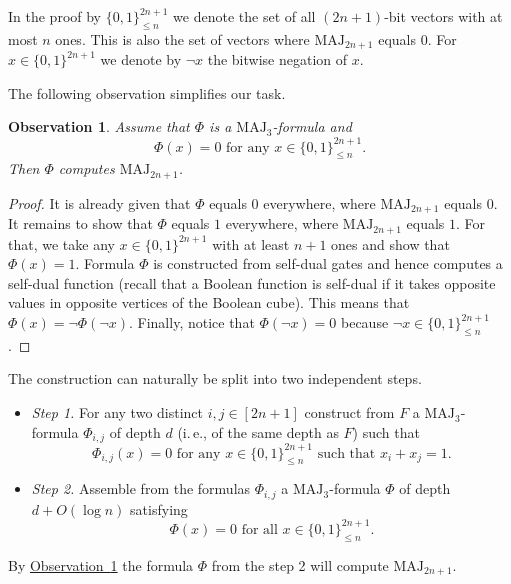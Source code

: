 \documentclass[11pt]{article}
\numberwithin{equation}{section}
\theoremstyle{definition}
\theoremstyle{plain}
\newcommand{\ie}{i.\,e.}
\newcommand{\expref}[2]{\hyperref[#2]{#1~\ref{#2}}}
\def\MAJ{\mathrm{MAJ}}
\newtheorem{observation}[theorem]{Observation}
\begin{document}
In the proof by $\{0, 1\}^{2n + 1}_{\le n}$ we denote the set of all $(2n + 1)$-bit vectors with at most $n$ ones. This is also the set of vectors where $\MAJ_{2n + 1}$ equals $0$. For $x\in\{0, 1\}^{2n + 1}$ we denote by $\lnot x$ the %
bitwise   %
negation of $x$.

The following observation simplifies our task.
\begin{observation}
\label{simple_obs}
Assume that $\Phi$ is a $\MAJ_3$-formula and 
\[\Phi(x) = 0 \mbox{ for any } x\in\{0, 1\}^{2n + 1}_{\le n}.\]
Then $\Phi$ computes $\MAJ_{2n + 1}$.
\end{observation}
\begin{proof}
It is already given that $\Phi$ equals $0$ everywhere, where $\MAJ_{2n + 1}$ equals $0$. It remains to show that $\Phi$ equals $1$ everywhere, where $\MAJ_{2n + 1}$ equals $1$. For that, we take any $x\in\{0, 1\}^{2n + 1}$ with at least $n + 1$ ones and show that $\Phi(x) = 1$. Formula $\Phi$ is constructed from self-dual gates and hence computes a self-dual function (recall that a Boolean function is self-dual if it takes opposite values in opposite vertices of the Boolean cube). This means that $\Phi(x) = \lnot \Phi(\lnot x)$. Finally, notice that $\Phi(\lnot x) = 0$ because $\lnot x\in\{0, 1\}^{2n + 1}_{\le n}$.
\end{proof}
%
The construction can naturally be  %
split into two independent steps.

\begin{itemize}
\item \emph{Step 1.} For any two distinct $i, j\in [2n + 1]$ construct from $F$ a $\MAJ_3$-formula $\Phi_{i,j}$ of depth $d$ (\ie, of the same depth as $F$) such that
\[
\Phi_{i,j}(x) = 0 \mbox{ for any } x\in\{0, 1\}^{2n + 1}_{\le n} \mbox{ such that } x_i + x_j = 1.\]
\item \emph{Step 2.} Assemble from the formulas $\Phi_{i,j}$ a $\MAJ_3$-formula $\Phi$ of depth $d + O(\log n)$ satisfying 
\[\Phi(x) = 0 \mbox{ for all } x\in\{0, 1\}^{2n + 1}_{\le n}.\]
\end{itemize}
By \expref{Observation}{simple_obs} the formula $\Phi$ from the step 2 will compute $\MAJ_{2n + 1}$.

\bigskip
\end{document}
